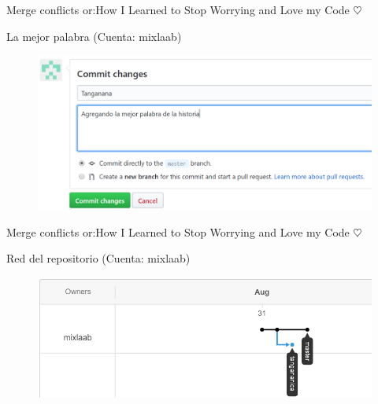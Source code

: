 \documentclass[10pt]{beamer}
\begin{document}
\begin{frame}{Merge conflicts or:}{How I Learned to Stop Worrying and Love my Code $\heartsuit$}

\begin{block}{La mejor palabra (Cuenta: mixlaab)}

\begin{figure}[h!]
\centering
\includegraphics [scale=0.3]{tanganana2}
\label{fig:issues}
\end{figure}
    
\end{block}

\end{frame}

\begin{frame}{Merge conflicts or:}{How I Learned to Stop Worrying and Love my Code $\heartsuit$}

\begin{block}{Red del repositorio (Cuenta: mixlaab)}

\begin{figure}[h!]
\centering
\includegraphics [scale=0.3]{network}
\label{fig:issues}
\end{figure}
    
\end{block}

\end{frame}
\end{document}

